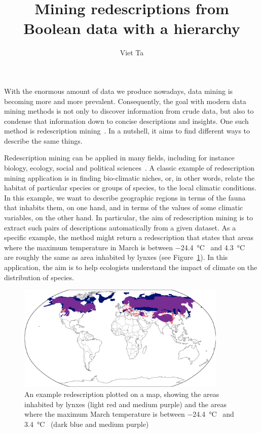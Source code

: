 \documentclass[12pt,a4paper]{article}
\author{Viet Ta}
\title{Mining redescriptions from Boolean data with a hierarchy}
\begin{document}
\maketitle

With the enormous amount of data we produce nowadays, data mining is becoming more and more prevalent. Consequently, the goal with modern data mining methods is not only to discover information from crude data, but also to condense that information down to concise descriptions and insights. One such method is redescription mining~\cite{ramakrishnan_turning_2004}. In a nutshell, it aims to find different ways to describe the same things.

Redescription mining can be applied in many fields, including for instance biology, ecology, social and political sciences~\cite{galbrun2018redescription}.
A classic example of redescription mining application is in finding bio-climatic niches, or, in other words, relate the habitat of particular species or groups of species, to the local climatic conditions.
In this example, we want to describe geographic regions in terms of the fauna that inhabits them, on one hand, and in terms of the values of some climatic variables, on the other hand. In particular, the aim of redescription mining is to extract such pairs of descriptions automatically from a given dataset.
As a specific example, the method might return a redescription that states that areas where the maximum temperature in March is between \SI{-24.4}{\degreeCelsius{}} and \SI{4.3}{\degreeCelsius{}} are roughly the same as area inhabited by lynxes (see Figure~\ref{fig:niche}).
In this application, the aim is to help ecologists understand the impact of climate on the distribution of species.

\begin{figure}[bt]
 \centering
 \includegraphics[width=10cm]{niche-finding}
 \caption{An example redescription plotted on a map, showing the areas inhabited by lynxes (light red and medium purple) and the areas where the maximum March temperature is between \SI{-24.4}{\degreeCelsius{}} and \SI{3.4}{\degreeCelsius{}} (dark blue and medium purple) \cite{galbrun2018redescription}}
 \label{fig:niche}
\end{figure}
\end{document}
